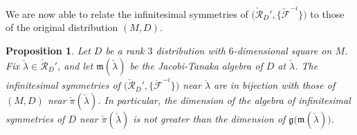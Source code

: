 \documentclass[11pt,letterpaper]{amsart}
\newtheorem{prop}[theorem]{Proposition}
\numberwithin{equation}{section}
\begin{document}
We are now able to relate the infinitesimal symmetries of $\big(\check{\mathcal R}_D',\{\check{\mathcal F}^{-i}\}\big)$ to those of the original distribution $(M,D)$.

\begin{prop}
    \label{Prop: Jacobi alg bij}
    Let $D$ be a rank $3$ distribution with $6$-dimensional square on $M$. Fix $\check\lambda\in {\check{\mathcal R}}_D'$, and let ${\mathfrak{m}}(\check{\lambda})$ be the Jacobi-Tanaka algebra of $D$ at $\check\lambda$. The infinitesimal symmetries of $\big({\check{\mathcal{R}}}_D',\{\check {\mathcal F}^{-i}\}\big)$ near $\check \lambda$ are in bijection with those of $(M,D)$ near $\check\pi(\check\lambda)$. In particular, the dimension of the algebra of infinitesimal symmetries of $D$ near $\check \pi(\check \lambda)$ is not greater than the dimension of $\mathfrak{g}\big({\mathfrak{m}}(\check\lambda)\big)$.
\end{prop}
\end{document}
